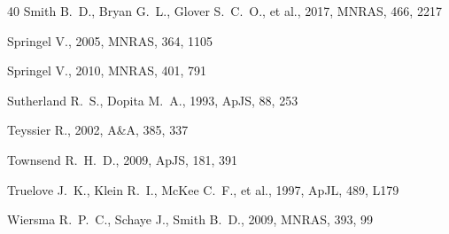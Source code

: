 \documentclass[fleqn,usenatbib]{mnras}
\begin{document}
\begin{thebibliography}{40}
Smith B.~D., Bryan G.~L., Glover S.~C.~O., et al., 2017, MNRAS, 466, 2217

Springel V., 2005, MNRAS, 364, 1105

Springel V., 2010, MNRAS, 401, 791

Sutherland R.~S., Dopita M.~A., 1993, ApJS, 88, 253

Teyssier R., 2002, A\&A, 385, 337

Townsend R.~H.~D., 2009, ApJS, 181, 391

Truelove J.~K., Klein R.~I., McKee C.~F., et al., 1997, ApJL, 489, L179

Wiersma R.~P.~C., Schaye J., Smith B.~D., 2009, MNRAS, 393, 99

\end{thebibliography}

\bsp
\label{lastpage}
\end{document}
